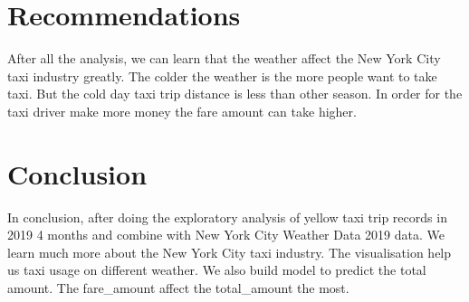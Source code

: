 \documentclass[11pt]{article}
\begin{document}
\section{Recommendations}
After all the analysis, we can learn that the weather affect the New York City taxi industry greatly. The colder the weather is the more people want to take taxi. But the cold day taxi trip distance is less than other season. In order for the taxi driver make more money the fare amount can take higher. 

\section{Conclusion}
In conclusion, after doing the exploratory analysis of yellow taxi trip records in 2019 4 months and combine with New York City Weather Data 2019 data. We learn much more about the New York City taxi industry. The visualisation help us taxi usage on different weather. We also build model to predict the total amount. The fare\_amount affect the total\_amount the most.

\clearpage

\printbibliography
\end{document}

